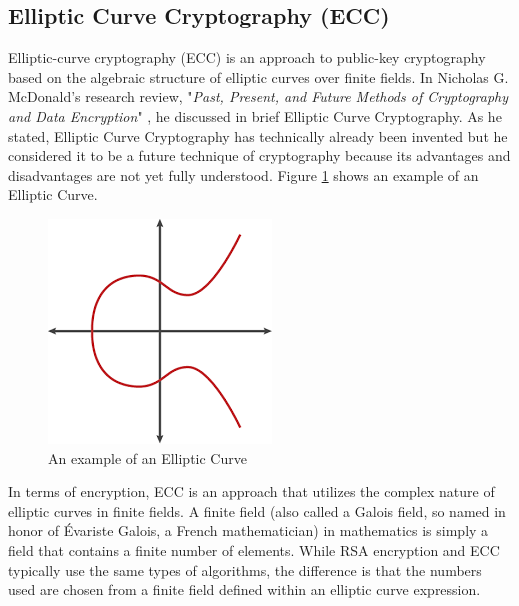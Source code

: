 \documentclass[journal]{IEEEtran}
\begin{document}
\subsection{\textbf{Elliptic Curve Cryptography (ECC)}}
Elliptic-curve cryptography (ECC) is an approach to public-key cryptography based on the algebraic structure of elliptic curves over finite fields. In Nicholas G. McDonald's research review, "\textit{Past, Present, and Future Methods of Cryptography and Data Encryption}" \cite{encryption_research}, he discussed in brief Elliptic Curve Cryptography. As he stated, Elliptic Curve Cryptography has technically already been invented but he considered it to be a future technique of cryptography because its advantages and disadvantages are not yet fully understood. Figure \ref{fig:ecc} shows an example of an Elliptic Curve.

\newline
\begin{figure}[!h]
    \centering
    \includegraphics[scale=.5]{ecc2}
    \caption{An example of an Elliptic Curve}
    \label{fig:ecc}
\end{figure}

In terms of encryption, ECC is an approach that utilizes the complex nature of elliptic curves in finite fields. A finite field (also called a Galois field, so named in honor of Évariste Galois, a French mathematician) in mathematics is simply a field that contains a finite number of elements. While RSA encryption and ECC typically use the same types of algorithms, the difference is that the numbers used are chosen from a finite field defined within an elliptic curve expression.
\end{document}
